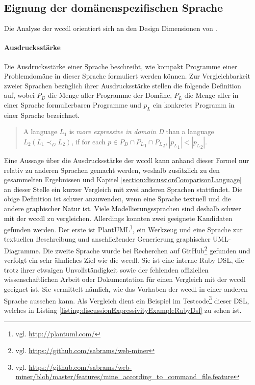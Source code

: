 \subsection{Eignung der domänenspezifischen Sprache}
    \label{section:discussionInterpretationLanguage}
    Die Analyse der \gls{wccdl} orientiert sich
    an den Design Dimensionen von \cite{voelter:DslEngineering}.

    \paragraph{Ausdrucksstärke}
    Die Ausdrucksstärke einer Sprache beschreibt,
    wie kompakt Programme einer Problemdomäne in dieser Sprache
    formuliert werden können.
    Zur Vergleichbarkeit zweier Sprachen bezüglich ihrer Ausdrucksstärke
    stellen \citet[Kapitel 4.1]{voelter:DslEngineering} die folgende
    Definition auf, wobei
    $P_D$ die Menge aller Programme der Domäne,
    $P_L$ die Menge aller in einer Sprache formulierbaren Programme und
    $p_L$ ein konkretes Programm in einer Sprache bezeichnet.

    \begin{quote}
        A language $L_1$ is \textit{more expressive in domain D}
        than a language $L_2 (L_1 {\prec}_D L_2)$,
        if for each $p \in P_D \cap {P_L}_1 \cap {P_L}_2, |{p_L}_1| < |{p_L}_2|$.
    \end{quote}

    Eine Aussage über die Ausdrucksstärke der \gls{wccdl} kann anhand dieser Formel
    nur relativ zu anderen Sprachen gemacht werden,
    weshalb zusätzlich zu den gesammelten Ergebnissen und
    Kapitel \ref{section:discussionComparisonLanguage}
    an dieser Stelle ein kurzer Vergleich mit zwei anderen Sprachen stattfindet.
    Die obige Definition ist schwer anzuwenden,
    wenn eine Sprache textuell und die andere graphischer Natur ist.
    Viele Modellierungssprachen sind deshalb schwer mit der \gls{wccdl} zu vergleichen.
    Allerdings konnten zwei geeignete Kandidaten gefunden werden.
    Der erste ist PlantUML\footnote{vgl. \url{http://plantuml.com/}},
    ein Werkzeug und eine Sprache zur textuellen Beschreibung und anschließender
    Generierung graphischer UML-Diagramme.
    Die zweite Sprache wurde bei Recherchen auf
    GitHub\footnote{vgl. \url{https://github.com/sabrams/web-miner}} gefunden
    und verfolgt ein sehr ähnliches Ziel wie die \gls{wccdl}.
    Sie ist eine interne Ruby DSL, die trotz ihrer etwaigen Unvollständigkeit sowie der fehlenden
    offiziellen wissenschaftlichen Arbeit oder Dokumentation
    für einen Vergleich mit der \gls{wccdl} geeignet ist.
    Sie vermittelt nämlich, wie das Vorhaben der \gls{wccdl}
    in einer anderen Sprache aussehen kann.
    Als Vergleich dient ein Beispiel im
    Testcode\footnote{vgl. \url{https://github.com/sabrams/web-miner/blob/master/features/mine_according_to_command_file.feature}}
    dieser DSL, welches in Listing \ref{listing:discussionExpressivityExampleRubyDsl}
    zu sehen ist.

